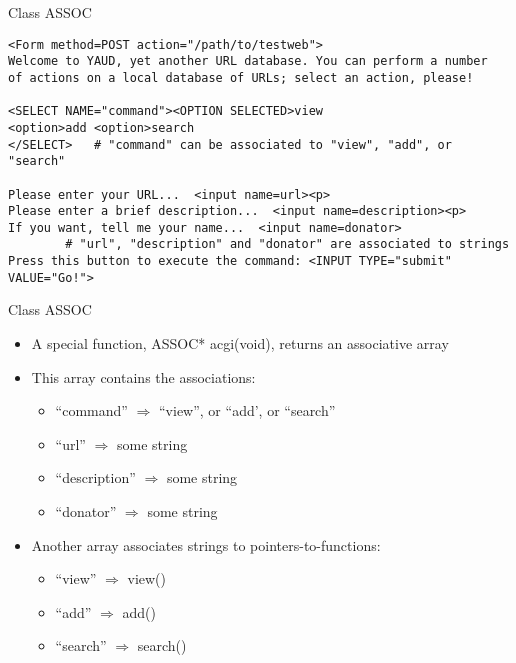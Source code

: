 \begin{frame}[fragile]{Class ASSOC}
\begin{small}
\begin{verbatim}
<Form method=POST action="/path/to/testweb">
Welcome to YAUD, yet another URL database. You can perform a number
of actions on a local database of URLs; select an action, please!

<SELECT NAME="command"><OPTION SELECTED>view
<option>add <option>search
</SELECT>   # "command" can be associated to "view", "add", or "search"

Please enter your URL...  <input name=url><p>
Please enter a brief description...  <input name=description><p>
If you want, tell me your name...  <input name=donator>
        # "url", "description" and "donator" are associated to strings
Press this button to execute the command: <INPUT TYPE="submit" VALUE="Go!"> 
\end{verbatim}
\end{small}

\end{frame}
\begin{frame}[fragile]{Class ASSOC}

\begin{itemize}
\item A special function, ASSOC* acgi(void), returns an associative array
\item This array contains the associations:
  \begin{itemize}
    \item ``command'' $\Rightarrow$ ``view'', or ``add', or ``search''
    \item ``url''  $\Rightarrow$  some string
    \item ``description''  $\Rightarrow$  some string
    \item ``donator''  $\Rightarrow$  some string
  \end{itemize}
\item Another array associates strings to pointers-to-functions:
  \begin{itemize}
    \item ``view''  $\Rightarrow$ view()
    \item ``add''  $\Rightarrow$ add()
    \item ``search''  $\Rightarrow$ search()
  \end{itemize}
\end{itemize}

\end{frame}

